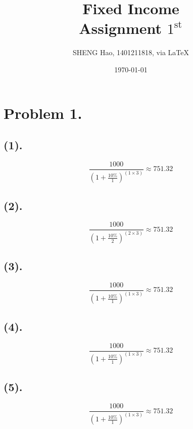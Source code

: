 \documentclass{article}
\begin{document}
\title{Fixed Income\\Assignment $1^{\text{st}}$}
\author{{\normalsize SHENG Hao, 1401211818, via \LaTeX}}
\date{\today}

\maketitle

\def \Pr{{\rm Pr}}
\baselineskip 0.6cm


\section{Problem 1.}
\subsection{(1).}
\begin{equation}
   \frac{1000}{(1+\frac{10\%}{1})^{(1 \times 3)}} \approx 751.32
 \end{equation} 

\subsection{(2).}
\begin{equation}
   \frac{1000}{(1+\frac{10\%}{2})^{(2 \times 3)}} \approx 751.32
 \end{equation} 

\subsection{(3).}
\begin{equation}
   \frac{1000}{(1+\frac{10\%}{1})^{(1 \times 3)}} \approx 751.32
 \end{equation} 

\subsection{(4).}
\begin{equation}
   \frac{1000}{(1+\frac{10\%}{1})^{(1 \times 3)}} \approx 751.32
 \end{equation} 

\subsection{(5).}
\begin{equation}
   \frac{1000}{(1+\frac{10\%}{1})^{(1 \times 3)}} \approx 751.32
 \end{equation} 
 
\end{document}
